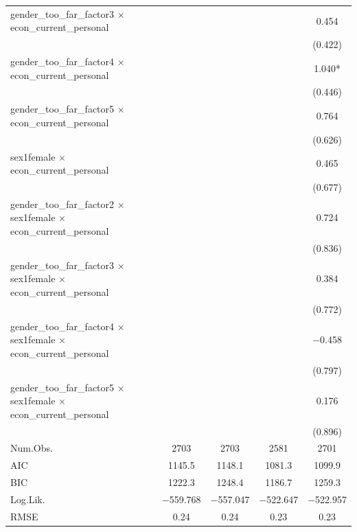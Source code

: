 \documentclass[
]{article}
\begin{document}
\begin{table}
{\begin{tabular}[t]{lcccc}
gender\_too\_far\_factor3 × econ\_current\_personal &  &  &  & \num{0.454}\\
 &  &  &  & (\num{0.422})\\
gender\_too\_far\_factor4 × econ\_current\_personal &  &  &  & \num{1.040}*\\
 &  &  &  & (\num{0.446})\\
gender\_too\_far\_factor5 × econ\_current\_personal &  &  &  & \num{0.764}\\
 &  &  &  & (\num{0.626})\\
sex1female × econ\_current\_personal &  &  &  & \num{0.465}\\
 &  &  &  & (\num{0.677})\\
gender\_too\_far\_factor2 × sex1female × econ\_current\_personal &  &  &  & \num{0.724}\\
 &  &  &  & (\num{0.836})\\
gender\_too\_far\_factor3 × sex1female × econ\_current\_personal &  &  &  & \num{0.384}\\
 &  &  &  & (\num{0.772})\\
gender\_too\_far\_factor4 × sex1female × econ\_current\_personal &  &  &  & \num{-0.458}\\
 &  &  &  & (\num{0.797})\\
gender\_too\_far\_factor5 × sex1female × econ\_current\_personal &  &  &  & \num{0.176}\\
 &  &  &  & (\num{0.896})\\
\midrule
Num.Obs. & \num{2703} & \num{2703} & \num{2581} & \num{2701}\\
AIC & \num{1145.5} & \num{1148.1} & \num{1081.3} & \num{1099.9}\\
BIC & \num{1222.3} & \num{1248.4} & \num{1186.7} & \num{1259.3}\\
Log.Lik. & \num{-559.768} & \num{-557.047} & \num{-522.647} & \num{-522.957}\\
RMSE & \num{0.24} & \num{0.24} & \num{0.23} & \num{0.23}\\
\bottomrule
\end{tabular}}
\end{table}
\end{document}
